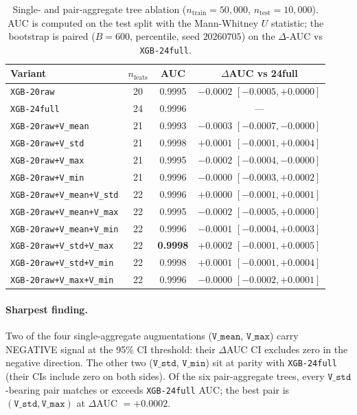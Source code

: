 \begin{table}[t]
\centering\small
\caption{Single- and pair-aggregate tree ablation ($n_{\text{train}}{=}50{,}000$,
$n_{\text{test}}{=}10{,}000$). AUC is computed on the test split with the
Mann-Whitney $U$ statistic; the bootstrap is paired ($B{=}600$, percentile,
seed $20260705$) on the $\Delta$-AUC vs \texttt{XGB-24full}.}
\label{tab:p8-single-sensor}
\begin{tabular}{lccc}
\toprule
Variant & $n_{\text{feats}}$ & AUC & $\Delta$AUC vs 24full \\
\midrule
\texttt{XGB-20raw}                 & 20 & 0.9995 & $-0.0002$ $[-0.0005,+0.0000]$ \\
\texttt{XGB-24full}                & 24 & 0.9996 & ---                    \\
\texttt{XGB-20raw+V\_mean}         & 21 & 0.9993 & $\mathbf{-0.0003}$ $\mathbf{[-0.0007,-0.0000]}$ \\
\texttt{XGB-20raw+V\_std}          & 21 & 0.9998 & $+0.0001$ $[-0.0001,+0.0004]$ \\
\texttt{XGB-20raw+V\_max}          & 21 & 0.9995 & $\mathbf{-0.0002}$ $\mathbf{[-0.0004,-0.0000]}$ \\
\texttt{XGB-20raw+V\_min}          & 21 & 0.9996 & $-0.0000$ $[-0.0003,+0.0002]$ \\
\texttt{XGB-20raw+V\_mean+V\_std}  & 22 & 0.9996 & $+0.0000$ $[-0.0001,+0.0001]$ \\
\texttt{XGB-20raw+V\_mean+V\_max}  & 22 & 0.9995 & $-0.0002$ $[-0.0005,+0.0000]$ \\
\texttt{XGB-20raw+V\_mean+V\_min}  & 22 & 0.9996 & $-0.0001$ $[-0.0004,+0.0003]$ \\
\texttt{XGB-20raw+V\_std+V\_max}   & 22 & \textbf{0.9998} & $+0.0002$ $[-0.0001,+0.0005]$ \\
\texttt{XGB-20raw+V\_std+V\_min}   & 22 & 0.9998 & $+0.0001$ $[-0.0001,+0.0004]$ \\
\texttt{XGB-20raw+V\_max+V\_min}   & 22 & 0.9996 & $-0.0000$ $[-0.0002,+0.0001]$ \\
\bottomrule
\end{tabular}
\end{table}

\paragraph{Sharpest finding.}
Two of the four single-aggregate augmentations ($\texttt{V\_mean}$,
$\texttt{V\_max}$) carry NEGATIVE signal at the 95\% CI threshold:
their $\Delta$AUC CI excludes zero in the negative direction. The
other two ($\texttt{V\_std}$, $\texttt{V\_min}$) sit at parity with
\texttt{XGB-24full} (their CIs include zero on both sides). Of the
six pair-aggregate trees, every $\texttt{V\_std}$-bearing pair matches
or exceeds \texttt{XGB-24full} AUC; the best pair is
$(\texttt{V\_std}, \texttt{V\_max})$ at $\Delta$AUC $= +0.0002$.

